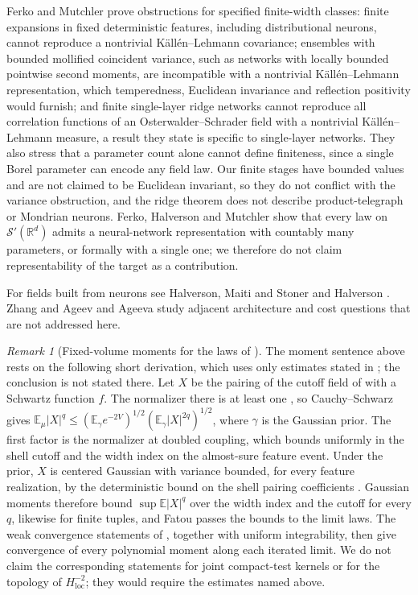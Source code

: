 \documentclass[11pt]{article}
\theoremstyle{plain}
\theoremstyle{definition}
\theoremstyle{remark}
\newtheorem{remark}[theorem]{Remark}
\newcommand{\R}{\mathbb{R}}
\newcommand{\E}{\mathbb{E}}
\newcommand{\cS}{\mathcal{S}}
\begin{document}
Ferko and Mutchler \cite{FerkoMutchler2026v1} prove obstructions for specified
finite-width classes: finite expansions in fixed deterministic features,
including distributional neurons, cannot reproduce a nontrivial
K\"all\'en--Lehmann covariance; ensembles with bounded mollified coincident
variance, such as networks with locally bounded pointwise second moments, are
incompatible with a nontrivial K\"all\'en--Lehmann representation, which
temperedness, Euclidean invariance and reflection positivity would furnish; and
finite single-layer ridge networks cannot reproduce all correlation functions of
an Osterwalder--Schrader field with a nontrivial K\"all\'en--Lehmann measure, a
result they state is specific to single-layer networks. They also stress that a
parameter count alone cannot define finiteness, since a single Borel parameter
can encode any field law. Our finite stages have bounded values and are not
claimed to be Euclidean invariant, so they do not conflict with the variance
obstruction, and the ridge theorem does not describe product-telegraph or
Mondrian neurons. Ferko, Halverson and Mutchler
\cite{FerkoHalversonMutchler2026v1} show that every law on $\cS'(\R^{d})$ admits a
neural-network representation with countably many parameters, or formally with a
single one; we therefore do not claim representability of the target as a
contribution.

For fields built from neurons see Halverson, Maiti and Stoner
\cite{HalversonMaitiStoner2021} and Halverson \cite{Halverson2021Neurons}. Zhang
\cite{Zhang2026OptimalArchitecture} and Ageev and Ageeva
\cite{AgeevAgeeva2026Transformer} study adjacent architecture and cost questions
that are not addressed here.

\begin{remark}[Fixed-volume moments for the laws of \cite{Frank2026v2}]\label{rem:frank-moments}
The moment sentence above rests on the following short derivation, which uses
only estimates stated in \cite{Frank2026v2}; the conclusion is not stated there.
Let $X$ be the pairing of the cutoff field of \cite{Frank2026v2} with a Schwartz
function $f$. The normalizer there is at least one \cite[Lemma~2.8]{Frank2026v2},
so Cauchy--Schwarz gives
$\E_\mu|X|^{q}\le(\E_\gamma e^{-2V})^{1/2}(\E_\gamma|X|^{2q})^{1/2}$, where $\gamma$ is the Gaussian
prior. The first factor is the normalizer at doubled coupling, which
\cite{Frank2026v2} bounds uniformly in the shell cutoff and the width index on
the almost-sure feature event. Under the prior, $X$ is centered Gaussian with
variance bounded, for every feature realization, by the deterministic bound on
the shell pairing coefficients \cite[(6.38)]{Frank2026v2}. Gaussian moments
therefore bound $\sup\E|X|^{q}$ over the width index and the cutoff for every $q$,
likewise for finite tuples, and Fatou passes the bounds to the limit laws. The
weak convergence statements of \cite[Lemma~7.5, Thm.~6.6(c), Thm.~7.6,
Cor.~7.8]{Frank2026v2}, together with uniform integrability, then give convergence
of every polynomial moment along each iterated limit. We do not claim the
corresponding statements for joint compact-test kernels or for the topology of
$H^{-2}_{\mathrm{loc}}$; they would require the estimates named above.
\end{remark}
\end{document}
